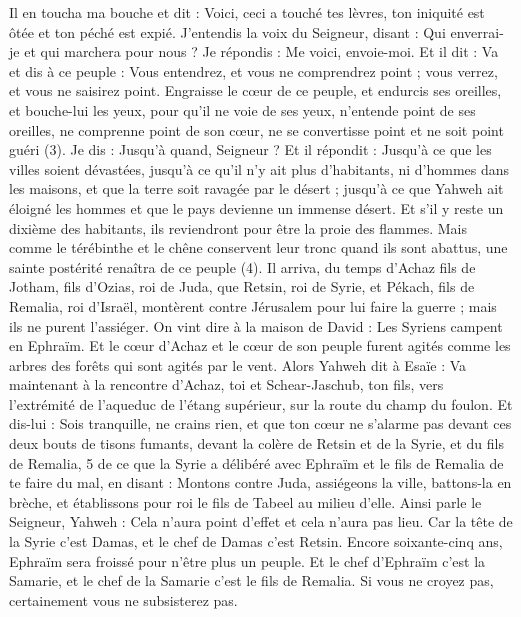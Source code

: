 \begin{multicols}{2}
Il en toucha ma bouche et dit : Voici, ceci a touché tes lèvres, ton iniquité est ôtée et ton péché est expié.
J’entendis la voix du Seigneur, disant : Qui enverrai-je et qui marchera pour nous ? Je répondis : Me voici, envoie-moi.
Et il dit : Va et dis à ce peuple : Vous entendrez, et vous ne comprendrez point ; vous verrez, et vous ne saisirez point.
Engraisse le cœur de ce peuple, et endurcis ses oreilles, et bouche-lui les yeux, pour qu’il ne voie de ses yeux, n’entende point de ses oreilles, ne comprenne point de son cœur, ne se convertisse point et ne soit point guéri (3).
Je dis : Jusqu’à quand, Seigneur ? Et il répondit : Jusqu’à ce que les villes soient dévastées, jusqu’à ce qu'il n'y ait plus d'habitants, ni d'hommes dans les maisons, et que la terre soit ravagée par le désert ;
jusqu’à ce que Yahweh ait éloigné les hommes et que le pays devienne un immense désert.
Et s’il y reste un dixième des habitants, ils reviendront pour être la proie des flammes. Mais comme le térébinthe et le chêne conservent leur tronc quand ils sont abattus, une sainte postérité renaîtra de ce peuple (4).
\VerseOne{}Il arriva, du temps d'Achaz fils de Jotham, fils d'Ozias, roi de Juda, que Retsin, roi de Syrie, et Pékach, fils de Remalia, roi d'Israël, montèrent contre Jérusalem pour lui faire la guerre ; mais ils ne purent l’assiéger.
On vint dire à la maison de David : Les Syriens campent en Ephraïm. Et le cœur d'Achaz et le cœur de son peuple furent agités comme les arbres des forêts qui sont agités par le vent.
Alors Yahweh dit à Esaïe : Va maintenant à la rencontre d'Achaz, toi et Schear-Jaschub, ton fils, vers l’extrémité de l’aqueduc de l’étang supérieur, sur la route du champ du foulon.
Et dis-lui : Sois tranquille, ne crains rien, et que ton cœur ne s’alarme pas devant ces deux bouts de tisons fumants, devant la colère de Retsin et de la Syrie, et du fils de Remalia, 5 de ce que la Syrie a délibéré avec Ephraïm et le fils de Remalia de te faire du mal, en disant :
Montons contre Juda, assiégeons la ville, battons-la en brèche, et établissons pour roi le fils de Tabeel au milieu d'elle.
Ainsi parle le Seigneur, Yahweh : Cela n'aura point d'effet et cela n’aura pas lieu.
Car la tête de la Syrie c'est Damas, et le chef de Damas c'est Retsin. Encore soixante-cinq ans, Ephraïm sera froissé pour n'être plus un peuple.
Et le chef d'Ephraïm c'est la Samarie, et le chef de la Samarie c'est le fils de Remalia. Si vous ne croyez pas, certainement vous ne subsisterez pas.

\end{multicols}
